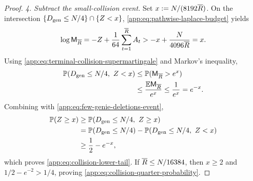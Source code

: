 \begin{proof}
\emph{4. Subtract the small-collision event.}
Set \(x:=N/(8192\overline R{})\). On the intersection
\(\{D_{\mathrm{gen}}\le N/4\}\cap\{Z<x\}\),
\eqref{app:eq:pathwise-laplace-budget} yields
\[
 \log \mathsf M_{\overline R}
 =-Z+\frac1{64}\sum_{t=1}^{\overline R{}}A_t
 >-x+\frac{N}{4096\overline R{}}
 =x.
\]
Using \eqref{app:eq:terminal-collision-supermartingale} and Markov's
inequality,
\begin{align*}
 \mathbb P(D_{\mathrm{gen}}\le N/4,\ Z<x)
 &\le \mathbb P(\mathsf M_{\overline R}>e^x)\\
 &\le\frac{\mathbb E\mathsf M_{\overline R}}{e^x}
 \le\frac1{e^x}=e^{-x}.
\end{align*}
Combining with \eqref{app:eq:few-genie-deletions-event},
\begin{align*}
 \mathbb P(Z\ge x)
 &\ge \mathbb P(D_{\mathrm{gen}}\le N/4,\ Z\ge x)\\
 &=\mathbb P(D_{\mathrm{gen}}\le N/4)
   -\mathbb P(D_{\mathrm{gen}}\le N/4,\ Z<x)\\
 &\ge \frac12-e^{-x},
\end{align*}
which proves \eqref{app:eq:collision-lower-tail}.
If \(\overline R{}\le N/16384\), then \(x\ge2\)
and \(1/2-e^{-2}>1/4\), proving
\eqref{app:eq:collision-quarter-probability}.
\end{proof}
